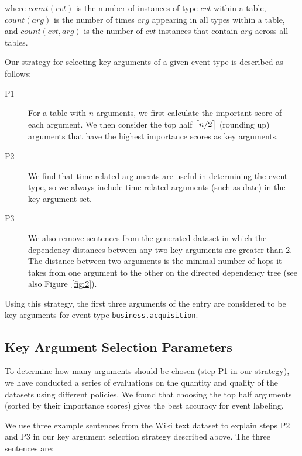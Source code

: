 where $count(cvt)$ is the number of instances of type $cvt$ within a \CVT table, $count(arg)$ is the number of times $arg$ appearing in all
\CVT types within a \CVT table, and $count(cvt, arg)$ is the number of $cvt$ instances that contain $arg$ across all \CVT tables.


Our strategy for selecting key arguments of a given event type is described as follows:

\begin{description}

\item [P1] For a \CVT table with $n$ arguments, we first calculate the important score of each argument. We then consider the top half
    $\ceil[\big]{n/2}$ (rounding up) arguments that have the highest importance scores as key arguments.

\item [P2] We find that time-related arguments are useful in determining the event type, so we always include time-related arguments
    (such as date) in the key argument set.

\item [P3] We also remove sentences from the generated dataset in which the dependency distances between any two key arguments are
    greater than 2. The distance between two arguments is the minimal number of hops it takes from one argument to the other on the
    directed dependency tree (see also Figure~\ref{fig:2}).

\end{description}

Using this strategy, the first three arguments of the \CVT entry are considered to be key arguments for event type
\texttt{business.acquisition}.


\subsection{Key Argument Selection Parameters}
To determine how many arguments should be chosen (step P1 in our strategy), we have conducted a series of evaluations on the quantity and
quality of the datasets using different policies. We found that choosing the top half arguments (sorted by their importance scores) gives
the best accuracy for event labeling.

We use three example sentences from the Wiki text dataset to explain steps P2 and P3 in our key argument selection strategy described
above. The three sentences are:

